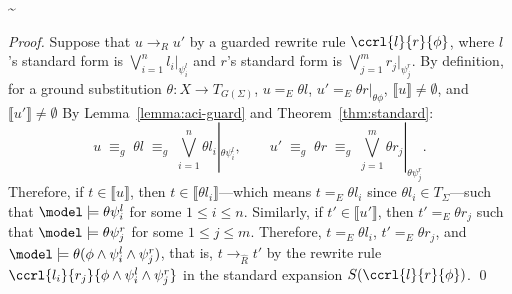 %


\sim*
\begin{proof}
Suppose that $u \to_R u'$ by a guarded rewrite rule $\ccrl{l}{r}{\phi}$,
where $l$'s standard form is $\bigvee_{i=1}^n l_i |_{\psi_i^l}$
and $r$'s standard form is $\bigvee_{j=1}^m r_j |_{\psi_j^r}$.
By definition,
for a ground substitution 
$\theta : X \to T_{G(\Sigma)}$,
$u =_E \theta l$, $u' =_E \theta r |_{\theta \phi}$,
$\llbracket  u \rrbracket \neq \emptyset$, and 
$\llbracket u' \rrbracket \neq \emptyset$
%
By Lemma~\ref{lemma:aci-guard} and Theorem~\ref{thm:standard}:
\[
\textstyle
u \;\equiv_g\; \theta l \;\equiv_g\; \bigvee_{i=1}^n \theta l_i |_{\theta \psi_i^l},
\qquad
u' \;\equiv_g\; \theta r \;\equiv_g\; \bigvee_{j=1}^m \theta r_j |_{\theta \psi_j^r}.
\]
Therefore,  
if $t \in \llbracket u \rrbracket$, then $t \in \llbracket \theta l_i \rrbracket$---which means $t =_E \theta l_i$ since $\theta l_i \in T_\Sigma$---such that $\model \models \theta \psi_i^l$ for some $1 \leq i \leq n$.
Similarly,
if $t' \in \llbracket u' \rrbracket$, then $t' =_E \theta r_j$ such that $\model \models \theta \psi_j^r$ for some $1 \leq j \leq m$.
Therefore, $t =_E \theta l_i$, $t' =_E \theta r_j$, and $\model \models \theta (\phi \wedge \psi_i^l \wedge \psi_j^r)$,
that is, $t \to_{\hat{R}} t' $ by the rewrite rule $\ccrl{l_i}{r_j}{\phi \wedge \psi_i^l \wedge \psi_j^r}$
in the standard expansion $S(\ccrl{l}{r}{\phi})$.
\qed
\end{proof}



